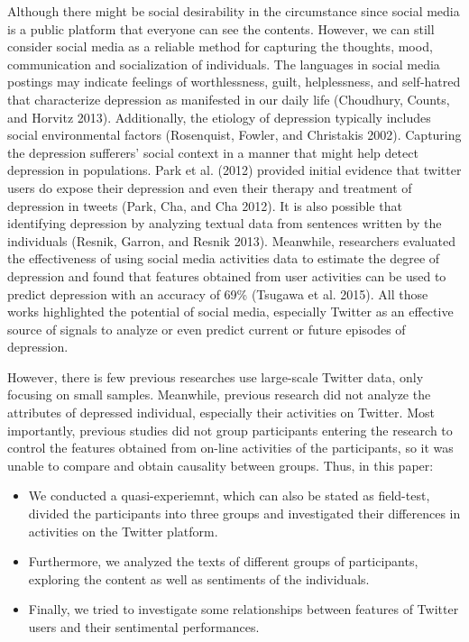 \documentclass[]{article}
\begin{document}
Although there might be social desirability in the circumstance since
social media is a public platform that everyone can see the contents.
However, we can still consider social media as a reliable method for
capturing the thoughts, mood, communication and socialization of
individuals. The languages in social media postings may indicate
feelings of worthlessness, guilt, helplessness, and self-hatred that
characterize depression as manifested in our daily life (Choudhury,
Counts, and Horvitz 2013). Additionally, the etiology of depression
typically includes social environmental factors (Rosenquist, Fowler, and
Christakis 2002). Capturing the depression sufferers' social context in
a manner that might help detect depression in populations. Park et al.
(2012) provided initial evidence that twitter users do expose their
depression and even their therapy and treatment of depression in tweets
(Park, Cha, and Cha 2012). It is also possible that identifying
depression by analyzing textual data from sentences written by the
individuals (Resnik, Garron, and Resnik 2013). Meanwhile, researchers
evaluated the effectiveness of using social media activities data to
estimate the degree of depression and found that features obtained from
user activities can be used to predict depression with an accuracy of
69\% (Tsugawa et al. 2015). All those works highlighted the potential of
social media, especially Twitter as an effective source of signals to
analyze or even predict current or future episodes of depression.

However, there is few previous researches use large-scale Twitter data,
only focusing on small samples. Meanwhile, previous research did not
analyze the attributes of depressed individual, especially their
activities on Twitter. Most importantly, previous studies did not group
participants entering the research to control the features obtained from
on-line activities of the participants, so it was unable to compare and
obtain causality between groups. Thus, in this paper:

\begin{itemize}
\item
  We conducted a quasi-experiemnt, which can also be stated as
  field-test, divided the participants into three groups and
  investigated their differences in activities on the Twitter platform.
\item
  Furthermore, we analyzed the texts of different groups of
  participants, exploring the content as well as sentiments of the
  individuals.
\item
  Finally, we tried to investigate some relationships between features
  of Twitter users and their sentimental performances.
\end{itemize}
\end{document}
